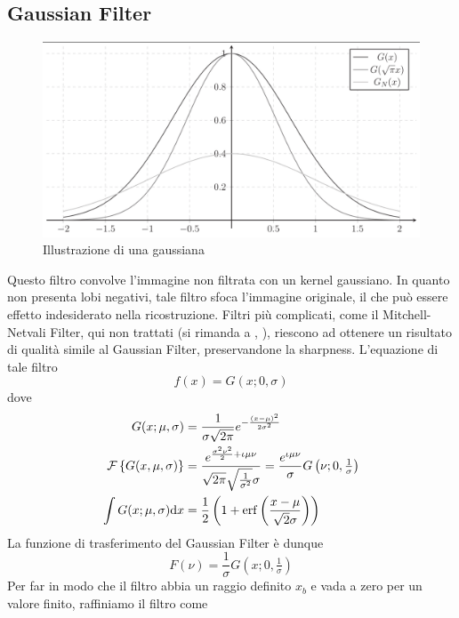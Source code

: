 \subsection{Gaussian Filter}
\begin{figure}[tb]
	\centering
	\includegraphics[width=0.8\linewidth, trim=0px 0px 0px 5px, clip]{../assets/chapter5_reconstruction_gaussian.png}
	\caption{Illustrazione di una gaussiana}
	\label{chapter5:reconstruction:gaussian}
\end{figure}
Questo filtro convolve l'immagine non filtrata con un kernel gaussiano. In quanto non presenta lobi negativi, tale filtro sfoca l'immagine originale, 
il che pu\`o essere effetto indesiderato nella ricostruzione. Filtri pi\`u complicati, come il Mitchell-Netvali Filter, qui non trattati 
(si rimanda a \cite{pegoraro}, \cite{pharr}), riescono ad ottenere un risultato di qualit\`a simile al Gaussian Filter, preservandone la sharpness. 
L'equazione di tale filtro
\begin{equation}
	f(x)=G(x;0,\sigma)
\end{equation}
dove 
\begin{align}
	G(x;\mu,\sigma)&=\frac{1}{\sigma\sqrt{2\pi}}e^{-\frac{(x-\mu)^2}{2\sigma^2}}\\
	\mathcal{F}\left\{G(x,\mu,\sigma)\right\}&=\frac{e^{\frac{\sigma^2\nu^2}{2}+\iota\mu\nu}}{\sqrt{2\pi}\sqrt{\tfrac{1}{\sigma^2}}\sigma}=
		\frac{e^{\iota\mu\nu}}{\sigma}G\left(\nu;0,\tfrac{1}{\sigma}\right)\\
	\int G(x;\mu,\sigma)\mathrm{d}x&=\frac{1}{2}\left(1+\operatorname{erf}\left(\frac{x-\mu}{\sqrt{2}\sigma}\right)\right)
\end{align}
La funzione di trasferimento del Gaussian Filter \`e dunque
\begin{equation}
	F(\nu)=\frac{1}{\sigma}G\left(x;0,\tfrac{1}{\sigma}\right)
\end{equation}
Per far in modo che il filtro abbia un raggio definito $x_b$ e vada a zero per un valore finito, raffiniamo il filtro come 
